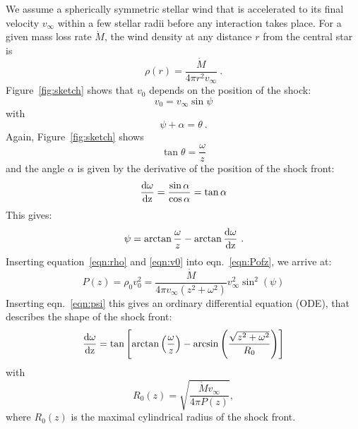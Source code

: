 \documentclass{emulateapj}
\begin{document}
We assume a spherically symmetric stellar wind that is accelerated to its final velocity $v_{\infty}$ within a few stellar radii before any interaction takes place. For a given mass loss rate $\dot M$, the wind density at any distance $r$ from the central star is 
\begin{equation}\label{eqn:rho}
\rho(r) = \frac{\dot M}{4 \pi r^2 v_{\infty}}\ .
\end{equation}
Figure~\ref{fig:sketch} shows that $v_0$ depends on the position of the shock:
\begin{equation}
\label{eqn:v0}v_0 = v_{\infty} \sin \psi
\end{equation}
with 
\begin{equation}\label{eqn:angle}
\psi+\alpha =  \theta \ .
\end{equation}
Again, Figure~\ref{fig:sketch} shows
\begin{equation}\label{eqn:theta}
\tan\theta = \frac{\omega}{z}
\end{equation}
and the angle $\alpha$ is given by the derivative of the position of the shock front:
\begin{equation}\label{eqn:deriv}
\frac{\rm{d}\omega}{\rm{d}z} = \frac{\sin \alpha}{\cos \alpha} = \tan{\alpha}
\end{equation}
This gives:
\begin{equation}\label{eqn:psi}
\psi = \arctan{\frac{\omega}{z}} - \arctan{\frac{\rm{d}\omega}{\rm{d}z}}\ .
\end{equation}
Inserting equation~\ref{eqn:rho} and \ref{eqn:v0} into eqn.~\ref{eqn:Pofz}, we arrive at: 
\begin{equation}\label{eqn:P}
P(z) = \rho_0 v_0^2 = \frac{\dot{M}}{4\pi v_{\infty}(z^2+\omega^2)} v_{\infty}^2 \sin^2(\psi)
\end{equation}
Inserting eqn.~\ref{eqn:psi} this gives an ordinary differential equation (ODE), that describes the shape of the shock front:
\begin{equation}\label{eqn:ode}
\frac{\rm{d}\omega}{\rm{d}z} = \tan\left[\arctan\left(\frac{\omega}{z}\right)-\arcsin\left(\frac{\sqrt{z^2+\omega^2}}{R_0}\right)\right]
\end{equation}
with
\begin{equation}\label{eqn:r0}
R_0(z) = \sqrt{\frac{\dot{M} v_{\infty}}{4\pi P(z)}},
\end{equation}
where $R_0(z)$ is the maximal cylindrical radius of the shock front.
\end{document}
